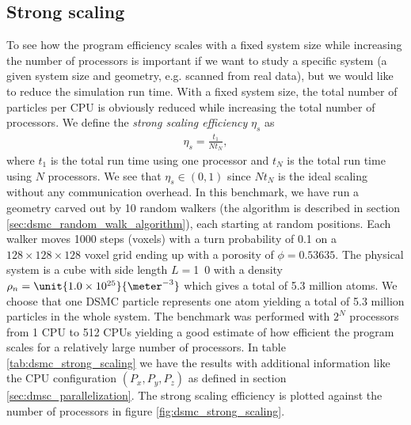 \subsection{Strong scaling}
To see how the program efficiency scales with a fixed system size while increasing the number of processors is important if we want to study a specific system (a given system size and geometry, e.g. scanned from real data), but we would like to reduce the simulation run time. With a fixed system size, the total number of particles per CPU is obviously reduced while increasing the total number of processors. We define the \textit{strong scaling efficiency} $\eta_s$ as
\begin{align}
	\eta_s = \frac{t_1}{Nt_N},
\end{align}
where $t_1$ is the total run time using one processor and $t_N$ is the total run time using $N$ processors. We see that $\eta_s\in (0,1)$ since $Nt_N$ is the ideal scaling without any communication overhead. In this benchmark, we have run a geometry carved out by 10 random walkers (the algorithm is described in section \ref{sec:dsmc_random_walk_algorithm}), each starting at random positions. Each walker moves 1000 steps (voxels) with a turn probability of 0.1 on a $128\times128\times128$ voxel grid ending up with a porosity of $\phi=0.53635$. The physical system is a cube with side length $L=$\unit{1.0}{\micro\meter} with a density $\rho_n=\unit{1.0\e{25}}{\meter^{-3}}$ which gives a total of 5.3 million atoms. We choose that one DSMC particle represents one atom yielding a total of 5.3 million particles in the whole system. The benchmark was performed with $2^N$ processors from 1 CPU to 512 CPUs yielding a good estimate of how efficient the program scales for a relatively large number of processors. In table \ref{tab:dsmc_strong_scaling} we have the results with additional information like the CPU configuration $(P_x, P_y, P_z)$ as defined in section \ref{sec:dmsc_parallelization}. The strong scaling efficiency is plotted against the number of processors in figure \ref{fig:dsmc_strong_scaling}.
